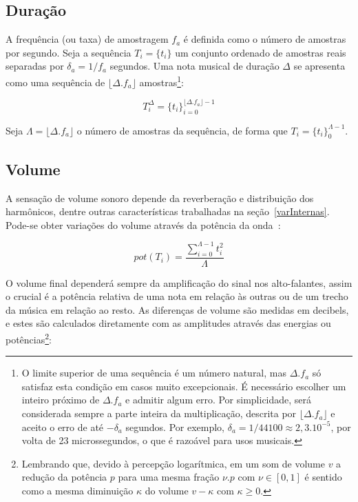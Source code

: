 \subsection{Duração}
A frequência (ou taxa) de amostragem $f_a$ 
é definida como o número de amostras por segundo. Seja
a sequência $T_i=\{t_i\}$ um conjunto ordenado de amostras reais separadas por $\delta_a=1/f_a$ segundos.
Uma nota musical de duração $\Delta$
se apresenta como uma sequência de $ \lfloor \Delta . f_a \rfloor $ amostras\footnote{O
limite superior de uma sequência é um número natural, mas $ \Delta . f_a $
só satisfaz esta condição em casos muito excepcionais. É necessário
escolher um inteiro próximo de $\Delta . f_a$ e admitir algum erro. Por simplicidade, será considerada sempre a parte inteira da multiplicação, descrita por $\lfloor \Delta . f_a \rfloor$ e aceito o erro de até $-\delta_a$ segundos. Por exemplo, $\delta_a=1/44100 \approx 2,3.10^{-5}$, por volta de 23 microssegundos, o que é razoável para usos musicais.}:

\begin{equation}\label{eq:dur}
T_{i}^{\Delta}={\{t_i\}}_{i=0}^{\lfloor \Delta . f_a \rfloor -1}
\end{equation}

Seja $\Lambda = \lfloor \Delta . f_a \rfloor$ o número de amostras da sequência, de forma que $T_i=\{t_i\}_0^{\Lambda-1}$.

\subsection{Volume}\label{subsec:volume}
A sensação de volume sonoro depende da reverberação e distribuição dos harmônicos, dentre outras características trabalhadas na seção~\ref{varInternas}. Pode-se obter variações do volume através da potência da onda~\cite{Chowning}:

\begin{equation}\label{eq:potencia}
pot(T_i)=\frac{\sum_{i=0}^{\Lambda -1} t_i^2}{\Lambda}
\end{equation} 

O volume final dependerá sempre da amplificação do sinal nos alto-falantes, assim o crucial é a potência relativa de uma nota em relação às outras ou de um trecho da música em relação ao resto. As diferenças de volume são medidas em decibels, e estes são
calculados diretamente com as amplitudes através das energias ou potências\footnote{Lembrando que, devido à percepção logarítmica,
em um som de volume $v$ a redução da potência $p$ para uma mesma fração $\nu . p $ 
com $\nu \in [0,1]$ é sentido como a mesma diminuição $\kappa$ do volume $v-\kappa$ com $\kappa \geq 0$.}:

